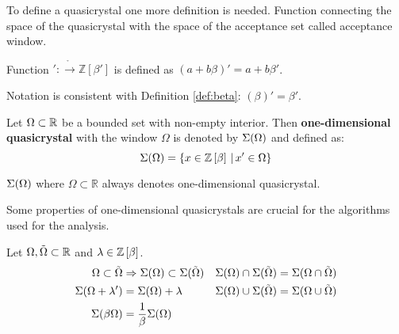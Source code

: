 \documentclass[text.tex]{subfiles}
\begin{document}
To define a quasicrystal one more definition is needed. Function connecting the space of the quasicrystal with the space of the acceptance set called acceptance window.

\begin{definition}
Function $':\ring\to\mathbb{Z}[\beta']$ is defined as $(a+b\beta)' = a+b\beta'$.
\end{definition}
\begin{remark}
Notation is consistent with Definition \ref{def:beta}: $(\beta)'=\beta'$.
\end{remark}

\begin{definition}
\label{def_oneDimension}
Let $\Omega \subset \mathbb{R}$ be a bounded set with non-empty interior. Then \textbf{one-dimensional quasicrystal} with the window $\Omega$ is denoted by $\Sigma(\Omega)$ and defined as:
$$\Sigma(\Omega) = \{ x\in \mathbb{Z}\left[\beta\right] \,|\, x'\in \Omega\}$$
\end{definition}

\begin{remark}
$\Sigma(\Omega)$ where $\Omega \subset \mathbb{R}$ always denotes one-dimensional quasicrystal.
\end{remark}

Some properties of one-dimensional quasicrystals are crucial for the algorithms used for the analysis.

\begin{theorem} 
\label{the:quasiProperties}
Let $\Omega, \tilde{\Omega} \subset \mathbb{R}$ and $\lambda\in\mathbb{Z}\left[\beta\right]$.
\begin{align*}
\Omega \subset \tilde{\Omega} &\Rightarrow \Sigma(\Omega) \subset \Sigma(\tilde{\Omega}) & \Sigma(\Omega) \cap \Sigma(\tilde{\Omega}) &= \Sigma(\Omega \cap \tilde{\Omega}) \\
\Sigma(\Omega + \lambda') &= \Sigma(\Omega) + \lambda & \Sigma(\Omega) \cup \Sigma(\tilde{\Omega}) &= \Sigma(\Omega \cup \tilde{\Omega}) \\
\Sigma(\beta\Omega) &= \frac{1}{\beta}\Sigma(\Omega) \\
\end{align*}
\end{theorem}
\end{document}
